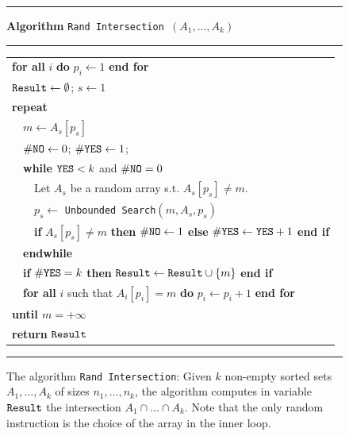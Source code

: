 \begin{figure}
\hrule
\vspace{3pt}
{\bf Algorithm} {\tt Rand Intersection $(A_1,\ldots,A_k)$}
\vspace{3pt}
\hrule

\begin{tabular*}{1cm}{lll}
\multicolumn{3}{l}{{\bf for all} $i$ {\bf do} $p_i\leftarrow 1$ {\bf end for}} \\
\multicolumn{3}{l}{$\hbox{\tt Result}\leftarrow \emptyset$; $s\leftarrow 1$} \\
\multicolumn{3}{l}{\bf repeat} \\
&\multicolumn{2}{l}{   $m \leftarrow A_s[p_s]$} \\
&\multicolumn{2}{l}{   $\#{\hbox{\tt NO}}\leftarrow 0$; $\#{\hbox{\tt YES}}\leftarrow 1$;}\\
&\multicolumn{2}{l}{ {\bf while} {${\hbox{\tt YES}} < k$  and  $\#{\hbox{\tt NO}}=0$} }\\
&&     Let $A_s$ be a random array s.t. $A_s[p_s]\neq m$.\\
&&     $p_s \leftarrow$ {\tt Unbounded Search}$(m,A_s,p_s)$ \\
&&     {\bf if }{$A_s[p_s]\neq m$} 
      {\bf then } $\#{\hbox{\tt NO}}\leftarrow 1$
      {\bf else }  $\#{\hbox{\tt YES}}\leftarrow{\hbox{\tt YES}}+1$ {\bf end if} \\
& \multicolumn{2}{l}{\bf endwhile} \\
& \multicolumn{2}{l}{{\bf if }{$\#{\hbox{\tt YES}} =k$ } {\bf then } $\hbox{\tt Result}\leftarrow \hbox{\tt Result}\cup \{ m \}$ {\bf end if} }\\
& \multicolumn{2}{l}{{\bf for all} $i$ such that $A_i[p_i]=m$ {\bf do} $p_i \leftarrow p_i+1$   {\bf end for} }\\
\multicolumn{3}{l}{\bf until $m=+\infty$} \\
\multicolumn{3}{l}{{\bf return } $\hbox{\tt Result}$} \\
\end{tabular*}
\hrule
\caption{The algorithm {\tt Rand Intersection}: 
Given $k$ non-empty sorted sets $A_1,\ldots,A_k$ of sizes
$n_1,\ldots,n_k$,
%
the algorithm computes in variable $\hbox{\tt Result}$ the intersection
$A_1\cap\ldots\cap A_k$.
%
Note that the only random instruction is the choice of the array in
the inner loop.
%
}
\label{fig:randIntersection}

\end{figure}


